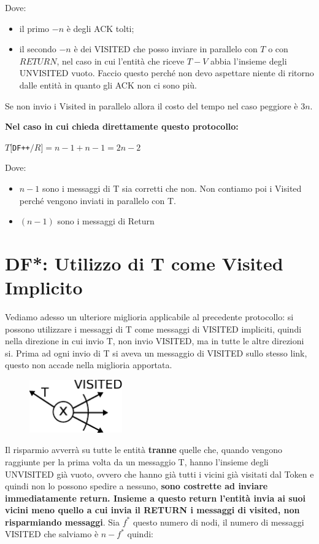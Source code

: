 Dove:
\begin{itemize}
    \item il primo $-n$ è degli ACK tolti;
    \item il secondo $-n$ è dei VISITED che posso inviare in parallelo con $T$ o
          con $RETURN$, nel caso in cui l'entità che riceve $T-V$ abbia l'insieme degli
          UNVISITED vuoto. Faccio questo perché non devo aspettare niente di ritorno
          dalle entità in quanto gli ACK non ci sono più.
\end{itemize}
Se non invio i Visited in parallelo allora il costo del tempo nel caso peggiore
è $3n$.

\textbf{Nel caso in cui chieda direttamente questo protocollo:}
\begin{center}
    $T[$\texttt{DF++}$/R] = n-1 + n-1 = 2n - 2$
\end{center}
Dove:
\begin{itemize}
    \item $n-1$ sono i messaggi di T sia corretti che non. Non contiamo poi i
          Visited perché vengono inviati in parallelo con T.
    \item $(n-1)$ sono i messaggi di Return
\end{itemize}

\section{DF*: Utilizzo di T come Visited Implicito}
Vediamo adesso un ulteriore miglioria applicabile al precedente protocollo: si
possono utilizzare i messaggi di T come messaggi di VISITED impliciti, quindi
nella direzione in cui invio T, non invio VISITED, ma in tutte le altre
direzioni si. Prima ad ogni invio di T si aveva un messaggio di VISITED sullo
stesso link, questo non accade nella miglioria apportata.

\begin{figure}[H]
    \centering
    \includegraphics[width=4cm, keepaspectratio]{capitoli/attraversamento/imgs/n_19}
\end{figure}

Il risparmio avverrà su tutte le entità \textbf{tranne} quelle che, quando
vengono raggiunte per la prima volta da un messaggio T, hanno l'insieme degli
UNVISITED già vuoto, ovvero che hanno già tutti i vicini già visitati dal Token
e quindi non lo possono spedire a nessuno, \textbf{sono costrette ad inviare
    immediatamente return. Insieme a questo return l'entità invia ai suoi vicini
    meno quello a cui invia il RETURN i messaggi di visited, non risparmiando
    messaggi}. Sia $f^*$ questo numero di nodi, il numero di messaggi VISITED che
salviamo è $n-f^*$ quindi:

